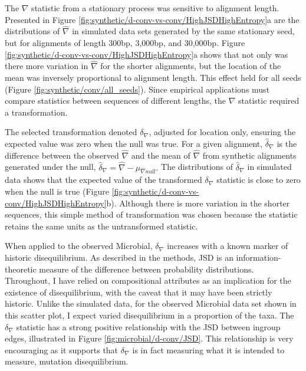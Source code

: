 The $\nabla$ statistic from a stationary process was sensitive to alignment length. Presented in Figure \ref{fig:synthetic/d-conv-vs-conv/HighJSDHighEntropy}a are the distributions of $\hat \nabla$ in simulated data sets generated by the same stationary seed, but for alignments of length 300bp, 3,000bp, and 30,000bp. Figure \ref{fig:synthetic/d-conv-vs-conv/HighJSDHighEntropy}a shows that not only was there more variation in $\hat \nabla$ for the shorter alignments, but the location of the mean was inversely proportional to alignment length. This effect held for all seeds (Figure \ref{fig:synthetic/conv/all_seeds}). Since empirical applications must compare statistics between sequences of different lengths, the $\nabla$ statistic required a transformation. 



The selected transformation denoted $\delta_\nabla$, adjusted for location only, ensuring the expected value was zero when the null was true. For a given alignment, $\hat \delta_\nabla$ is the difference between the observed $\hat \nabla$ and the mean of $\hat \nabla$ from synthetic alignments generated under the null, $\hat \delta_\nabla =  \hat\nabla - \mu_{\hat \nabla{null}}.$ The distributions of $\hat \delta_\nabla$ in simulated data shows that the expected value of the transformed $\delta_\nabla$ statistic is close to zero when the null is true (Figure \ref{fig:synthetic/d-conv-vs-conv/HighJSDHighEntropy}b). Although there is more variation in the shorter sequences, this simple method of transformation was chosen because the statistic retains the same units as the untransformed statistic. 

When applied to the observed Microbial, $\delta_\nabla$ increases with a known marker of historic disequilibrium. As described in the methods, JSD is an information-theoretic measure of the difference between probability distributions. Throughout, I have relied on compositional attributes as an implication for the existence of disequilibrium, with the caveat that it may have been strictly historic. Unlike the simulated data, for the observed Microbial data set shown in this scatter plot, I expect varied disequilibrium in a proportion of the taxa. The $\delta_\nabla$ statistic has a strong positive relationship with the JSD between ingroup edges, illustrated in Figure \ref{fig:microbial/d-conv/JSD}. This relationship is very encouraging as it supports that $\delta_\nabla$ is in fact measuring what it is intended to measure, mutation disequilibrium. 

